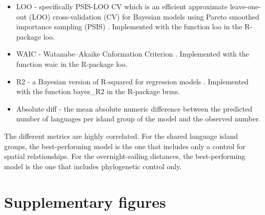 \documentclass[12pt,letterpaper]{article}
\begin{document}
\begin{itemize}
    \item LOO - specifically PSIS-LOO CV which is an efficient approximate leave-one-out (LOO) cross-validation (CV) for Bayesian models using Pareto smoothed importance sampling (PSIS) \citep{R-loo, loo2017a, loo2017b}. Implemented with the function loo in the R-package loo.
    \item WAIC - Watanabe–Akaike Cnformation Criterion \citep{R-loo, loo2017a, loo2017b}. Implemented with the function waic in the R-package loo.
    \item R2 - a Bayesian version of R-squared for regression models \citep{R-brms, brms2017, brms2018, brms2021}. Implemented with the function bayes\_R2 in the R-package brms.
    \item Absolute diff - the mean absolute numeric difference between the predicted number of languages per island group of the model and the observed number.
\end{itemize}





The different metrics are highly correlated. For the shared language island groups, the best-performing model is the one that includes only a control for spatial relationships. For the overnight-sailing distances, the best-performing model is the one that includes phylogenetic control only.

\newpage
\section{Supplementary figures}
\label{appendix_supp_figs}
\end{document}
